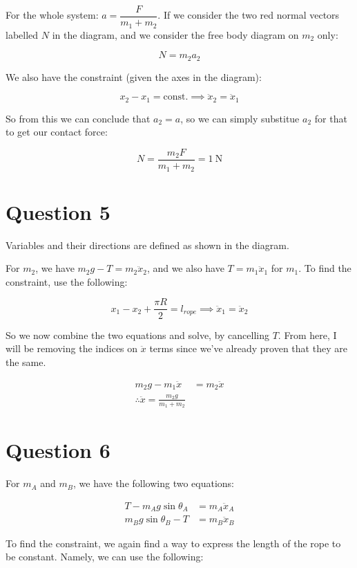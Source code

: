 \documentclass{article}
\theoremstyle{definition}
\numberwithin{equation}{section}
\numberwithin{definition}{section}
\begin{document}
	For the whole system: $ a = \dfrac{F}{m_1 + m_2}$. If we consider the two red normal vectors labelled $N$ in the diagram, and we consider the free body diagram on $m_2$ only:
	
	\[ N = m_2 a_2\]
	
	We also have the constraint (given the axes in the diagram):
	
	\[ x_2 - x_1 = \text{const.} \implies \ddot x_2 = \ddot x_1\]
	
	So from this we can conclude that $a_2 = a$, so we can simply substitue $a_2$ for that to get our contact force:
	
	\[ N = \frac{m_2 F}{m_1 + m_2} = 1 \ \text{N}\]
	
	\section{Question 5}
	
	Variables and their directions are defined as shown in the diagram. 
	
	\medskip
	
	For $m_2$, we have  $m_2g - T = m_2\ddot x_2$, and we also have $T = m_1 \ddot x_1$ for $m_1$. To find the constraint, use the following: 
	
	\[x_1 - x_2 + \frac{\pi R}{2} = l_{rope} \implies \ddot x_1 = \ddot x_2\]
	
	So we now combine the two equations and solve, by cancelling $T$. From here, I will be removing the indices on $\ddot x$ terms since we've already proven that they are the same.
	
	\begin{align*}
		m_2g - m_1\ddot x &= m_2 \ddot x\\
		\therefore \ddot x = \frac{m_2g}{m_1 + m_2}
	\end{align*}

	\section{Question 6}
	
	
	For $m_A$ and $m_B$, we have the following two equations: 
	
	\begin{align*}
		T - m_A g\sin\theta_A &= m_A \ddot x_A\\
		m_Bg \sin \theta_B - T &= m_B \ddot x_B
		\end{align*}
	
	To find the constraint, we again find a way to express the length of the rope to be constant. Namely, we can use the following:
	
\end{document}

